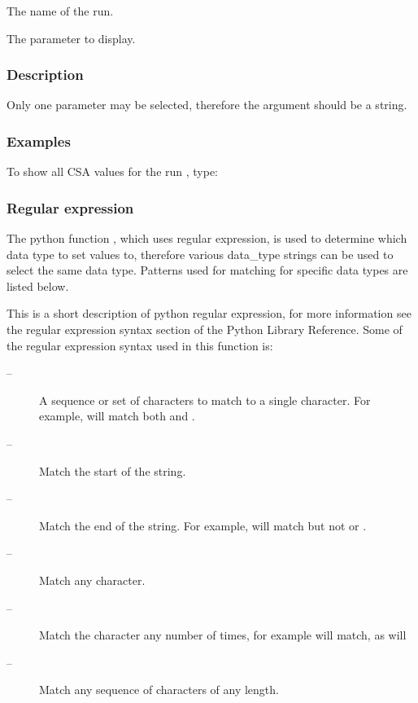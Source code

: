   The name of the run. 

  The parameter to display. 




\subsubsection{Description}

Only one parameter may be selected, therefore the  argument should be a string.



\subsubsection{Examples}

To show all CSA values for the run , type:




\subsubsection{Regular expression}

The python function , which uses regular expression, is used to determine which data type to set values to, therefore various data\_type strings can be used to select the same data type.  Patterns used for matching for specific data types are listed below.


This is a short description of python regular expression, for more information see the regular expression syntax section of the Python Library Reference.  Some of the regular expression syntax used in this function is:


\begin{description}
\item[\quotecmd{[]} --]  A sequence or set of characters to match to a single character.  For example,  will match both  and . 
\item[\quotecmd{\^{}} --]  Match the start of the string. 
\item[\quotecmd{\$} --]  Match the end of the string.  For example,  will match  but not  or . 
\item[ --]  Match any character. 
\item[ --]  Match the character  any number of times, for example  will match, as will  
\item[ --]  Match any sequence of characters of any length. 
\end{description}


